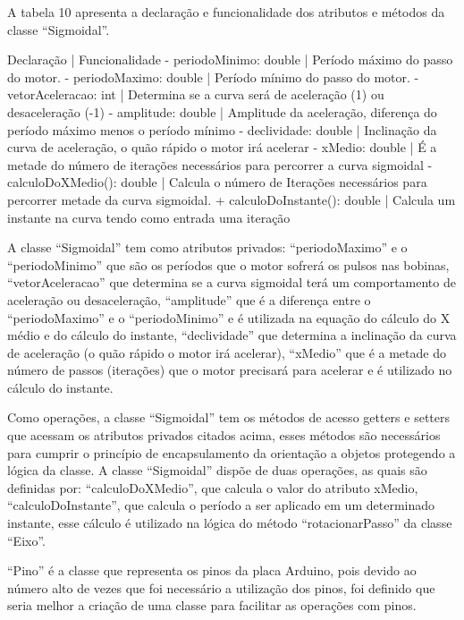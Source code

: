 A tabela 10 apresenta a declaração e funcionalidade dos atributos e métodos da classe “Sigmoidal”.


Declaração | Funcionalidade
- periodoMinimo: double | Período máximo do passo do motor.
- periodoMaximo: double | Período mínimo do passo do motor.
- vetorAceleracao: int | Determina se a curva será de aceleração (1) ou desaceleração (-1)
- amplitude: double | Amplitude da aceleração, diferença do período máximo menos o período mínimo
- declividade: double | Inclinação da curva de aceleração, o quão rápido o motor irá acelerar
- xMedio: double | É a metade do número de iterações necessários para percorrer a curva sigmoidal
- calculoDoXMedio(): double | Calcula o número de Iterações necessários para percorrer metade da curva sigmoidal.
+ calculoDoInstante(): double | Calcula um instante na curva tendo como entrada uma iteração

A classe “Sigmoidal” tem como atributos privados: “periodoMaximo” e o “periodoMinimo” que são os períodos 
que o motor sofrerá os pulsos nas bobinas, “vetorAceleracao” que determina se a curva sigmoidal terá 
um comportamento de aceleração ou desaceleração, “amplitude” que é a diferença entre o “periodoMaximo” 
e o “periodoMinimo” e é utilizada na equação do cálculo do X médio e do cálculo do instante, “declividade” 
que determina a inclinação da curva de aceleração (o quão rápido o motor irá acelerar), “xMedio” que é a 
metade do número de passos (iterações) que o motor precisará para acelerar e é utilizado no cálculo 
do instante. 

Como operações, a classe “Sigmoidal” tem os métodos de acesso getters e setters que acessam os atributos 
privados citados acima, esses métodos são necessários para cumprir o princípio de encapsulamento da orientação 
a objetos protegendo a lógica da classe. A classe “Sigmoidal” dispõe de duas operações, as quais são definidas 
por: “calculoDoXMedio”, que calcula o valor do atributo xMedio, “calculoDoInstante”, que calcula o período a 
ser aplicado em um determinado instante, esse cálculo é utilizado na lógica do método “rotacionarPasso” 
da classe “Eixo”.

“Pino” é a classe que representa os pinos da placa Arduino, pois devido ao número alto de vezes que foi 
necessário a utilização dos pinos, foi definido que seria melhor a criação de uma classe para facilitar 
as operações com pinos. 

